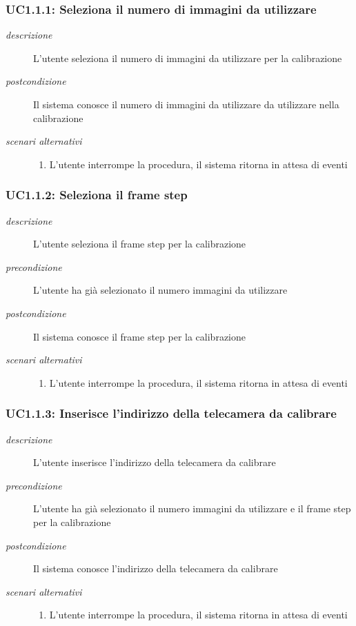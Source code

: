 \subsubsection{UC1.1.1: Seleziona il numero di immagini da utilizzare} \label{sec:UC1.1.1}
\begin{description}
\item[\em{descrizione }]L'utente seleziona il numero di immagini da utilizzare per la calibrazione
\item[\em{postcondizione }] Il sistema conosce il numero di immagini da utilizzare da utilizzare nella calibrazione
\item[\em{scenari alternativi }] \mbox{} 
\begin{enumerate} 
\item L'utente interrompe la procedura, il sistema ritorna in attesa di eventi
\end{enumerate}
\end{description}

\subsubsection{UC1.1.2: Seleziona il frame step} \label{sec:UC1.1.2}
\begin{description}
\item[\em{descrizione }]L'utente seleziona il frame step per la calibrazione
\item[\em{precondizione }] L'utente ha già selezionato il numero immagini da utilizzare
\item[\em{postcondizione }] Il sistema conosce il frame step per la calibrazione
\item[\em{scenari alternativi }] \mbox{} 
\begin{enumerate} 
\item L'utente interrompe la procedura, il sistema ritorna in attesa di eventi
\end{enumerate}
\end{description}

\subsubsection{UC1.1.3: Inserisce l'indirizzo della telecamera da calibrare} \label{sec:UC1.1.3}
\begin{description}
\item[\em{descrizione }]L'utente inserisce l'indirizzo della telecamera da calibrare
\item[\em{precondizione }] L'utente ha già selezionato il numero immagini da utilizzare e il frame step per la calibrazione
\item[\em{postcondizione }] Il sistema conosce l'indirizzo della telecamera da calibrare
\item[\em{scenari alternativi }] \mbox{} 
\begin{enumerate} 
\item L'utente interrompe la procedura, il sistema ritorna in attesa di eventi
\end{enumerate}
\end{description}

